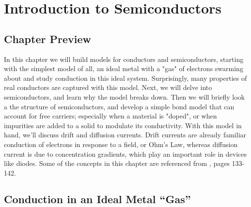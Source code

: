 \chapter{Introduction to Semiconductors}
\label{ch:ch03_semi}
\graphicspath{{./figs_semi/}}
\section{Chapter Preview}
In this chapter we will build models for conductors and semiconductors, starting with the simplest model of all, an ideal metal with a "gas" of electrons swarming about and study conduction in this ideal system.  Surprisingly, many properties of real conductors are captured with this model.  Next, we will delve into semiconductors, and learn why the model breaks down.  Then we will briefly look a the structure of semiconductors, and  develop a simple bond model that can account for free carriers; especially when a material is "doped", or when impurities are added to a solid to modulate its conductivity.  With this model in hand, we'll discuss drift and diffusion currents.  Drift currents are already familiar conduction of electrons in response to a field, or Ohm's Law, whereas diffusion current is due to concentration gradients, which play an important role in devices like diodes.  Some of the concepts in this chapter are referenced from \cite{purcell}, pages 133-142.
\section{Conduction in an Ideal Metal ``Gas''}
